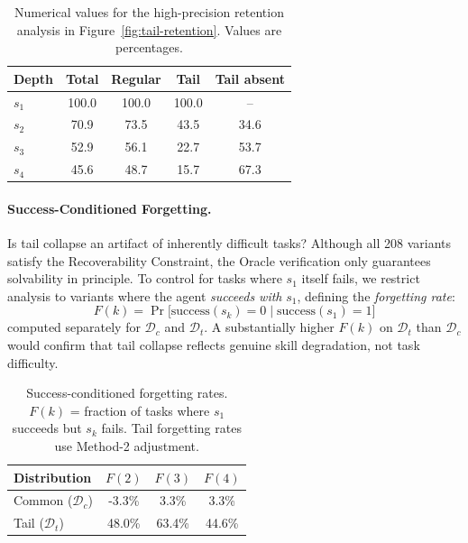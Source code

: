 \documentclass[11pt]{article}
\begin{document}
\begin{table}[t]
\centering
\small
\setlength{\tabcolsep}{3.8pt}
\renewcommand{\arraystretch}{1.08}
\begin{tabular}{lcccc}
\toprule
Depth & Total & Regular & Tail & Tail absent \\
\midrule
$s_1$ & 100.0 & 100.0 & 100.0 & -- \\
$s_2$ & 70.9  & 73.5  & 43.5  & 34.6 \\
$s_3$ & 52.9  & 56.1  & 22.7  & 53.7 \\
$s_4$ & 45.6  & 48.7  & 15.7  & 67.3 \\
\bottomrule
\end{tabular}
\caption{
Numerical values for the high-precision retention analysis in Figure~\ref{fig:tail-retention}. Values are percentages.
}
\label{tab:tail-retention-values}
\end{table}

\paragraph{Success-Conditioned Forgetting.}
\label{sec:forgetting}
Is tail collapse an artifact of inherently difficult tasks? Although all 208 variants satisfy the Recoverability Constraint, the Oracle verification only guarantees solvability in principle. To control for tasks where $s_1$ itself fails, we restrict analysis to variants where the agent \textit{succeeds with} $s_1$, defining the \textit{forgetting rate}:
\begin{equation}
F(k) = \Pr\big[\text{success}(s_k)=0 \;\big|\; \text{success}(s_1)=1\big]
\end{equation}
computed separately for $\mathcal{D}_c$ and $\mathcal{D}_t$. A substantially higher $F(k)$ on $\mathcal{D}_t$ than $\mathcal{D}_c$ would confirm that tail collapse reflects genuine skill degradation, not task difficulty.

\begin{table}[t]
\centering\small
\begin{tabular}{@{}lccc@{}}
\toprule
\textbf{Distribution} & $F(2)$ & $F(3)$ & $F(4)$ \\
\midrule
Common ($\mathcal{D}_c$) & -3.3\% & 3.3\% & 3.3\% \\
Tail ($\mathcal{D}_t$) & 48.0\% & 63.4\% & 44.6\% \\
\bottomrule
\end{tabular}
\caption{Success-conditioned forgetting rates. $F(k)$ = fraction of tasks where $s_1$ succeeds but $s_k$ fails. Tail forgetting rates use Method-2 adjustment.}
\label{tab:forgetting}
\end{table}
\end{document}
